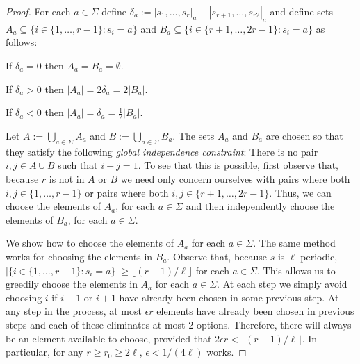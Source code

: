\documentclass{patmorin}
\begin{document}
\begin{proof}
    For each $a\in\Sigma$ define $\delta_a := |s_1,\ldots,s_r|_{a}-|s_{r+1},\ldots,s_{r2}|_{a}$ and define sets $A_a\subseteq\{i\in \{1,\ldots,r-1\}: s_i=a\}$ and $B_a\subseteq\{i\in\{r+1,\ldots,2r-1\}:s_i=a\}$ as follows:
    \begin{compactenum}
        \item If $\delta_a=0$ then $A_a=B_a=\emptyset$.
        \item If $\delta_a>0$ then $|A_a|=2\delta_a=2|B_a|$.
        \item If $\delta_a<0$ then $|A_a|=\delta_a=\tfrac{1}{2}|B_a|$.
    \end{compactenum}
    Let $A:=\bigcup_{a\in\Sigma} A_a$ and $B:=\bigcup_{a\in\Sigma} B_a$.
    The sets $A_a$ and $B_a$ are chosen so that they satisfy the following \emph{global independence constraint}:  There is no pair $i,j\in A\cup B$ such that $i-j=1$.  To see that this is possible, first observe that, because $r$ is not in $A$ or $B$ we need only concern ourselves with pairs where both $i,j\in\{1,\ldots,r-1\}$ or pairs where both $i,j\in\{r+1,\ldots,2r-1\}$.  Thus, we can choose the elements of $A_a$, for each $a\in\Sigma$ and then independently choose the elements of $B_a$, for each $a\in\Sigma$.

    We show how to choose the elements of $A_a$ for each $a\in\Sigma$.  The same method works for choosing the elements in $B_a$. Observe that, because $s$ is $\ell$-periodic, $|\{i\in \{1,\ldots,r-1\}:s_i=a\}|\ge \lfloor(r-1)/\ell\rfloor$ for each $a\in\Sigma$.  This allows us to greedily choose the elements in $A_a$ for each $a\in\Sigma$. At each step we simply avoid choosing $i$ if $i-1$ or $i+1$ have already been chosen in some previous step.  At any step in the process, at most $\epsilon r$ elements have already been chosen in previous steps and each of these eliminates at most $2$ options.  Therefore, there will always be an element available to choose, provided that $2\epsilon r < \lfloor(r-1)/\ell\rfloor$.  In particular, for any $r\ge r_0\ge 2\ell$, $\epsilon < 1/(4\ell)$ works.


\end{proof}
\end{document}
